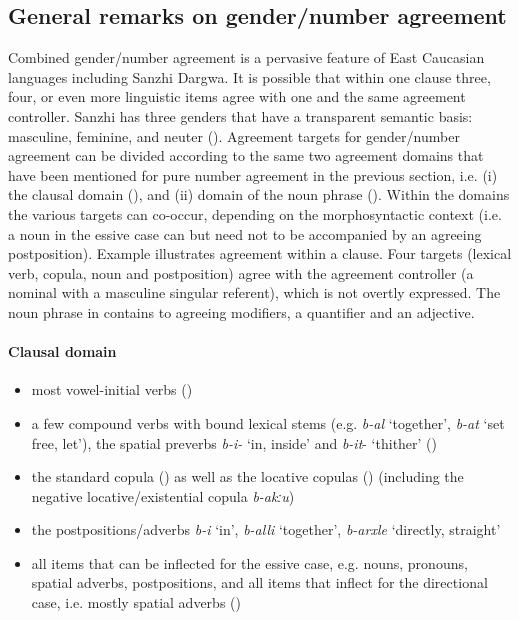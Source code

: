 \subsection{General remarks on gender/number agreement}
\label{General remarks on gender/number agreement} 
Combined gender/number agreement is a pervasive feature of East Caucasian languages including Sanzhi Dargwa. It is possible that within one clause three, four, or even more linguistic items agree with one and the same agreement controller. Sanzhi has three genders that have a transparent semantic basis: masculine, feminine, and neuter (). Agreement targets for gender/number agreement can be divided according to the same two agreement domains that have been mentioned for pure number agreement in the previous section, i.e. (i) the clausal domain (), and (ii) domain of the noun phrase (). Within the domains the various targets can co-occur, depending on the morphosyntactic context (i.e. a noun in the essive case can but need not to be accompanied by an agreeing postposition). Example  illustrates agreement within a clause. Four targets (lexical verb, copula, noun and postposition) agree with the agreement controller (a nominal with a masculine singular referent), which is not overtly expressed. The noun phrase in  contains to agreeing modifiers, a quantifier and an adjective.

\paragraph*{Clausal domain}

%
\begin{itemize}
	\item	most vowel-initial verbs ()
	\item a few compound verbs with bound lexical stems (e.g. \textit{b-al} ‘together', \textit{b-at} ‘set free, let'), the spatial preverbs \textit{b-i-} `in, inside' and \textit{b-it}- ‘thither' ()
	\item the standard copula () as well as the locative copulas () (including the negative locative/existential copula \textit{b-akːu})
	\item the postpositions/adverbs \textit{b-i} ‘in', \textit{b-alli} ‘together', \textit{b-arxle} ‘directly, straight'
	\item	all items that can be inflected for the essive case, e.g. nouns, pronouns, spatial adverbs, postpositions, and all items that inflect for the directional case, i.e. mostly spatial adverbs ()
	\end{itemize}


